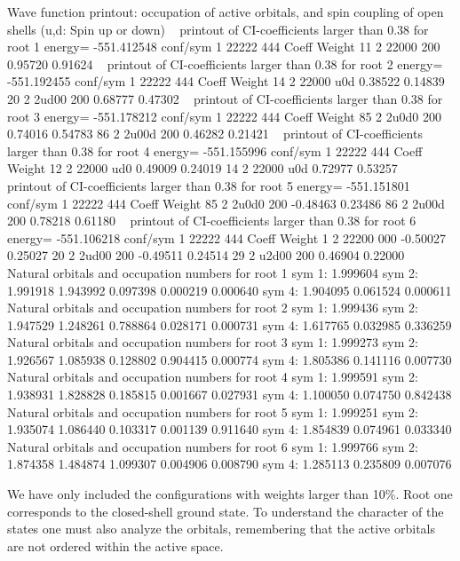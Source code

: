 \begin{sourcelisting}
                                  Wave function printout:
occupation of active orbitals, and spin coupling of open shells (u,d: Spin up or down)
~
	printout of CI-coefficients larger than  0.38 for root  1
      energy=	-551.412548
	conf/sym	1 22222 444	Coeff  Weight
            11	2 22000 200   0.95720 0.91624
~
	printout of CI-coefficients larger than  0.38 for root  2
	energy=	-551.192455
	conf/sym	1 22222 444	Coeff  Weight
            14	2 22000 u0d   0.38522 0.14839
            20	2 2ud00 200   0.68777 0.47302
~
	printout of CI-coefficients larger than  0.38 for root  3
	energy=	-551.178212
	conf/sym	1 22222 444	Coeff  Weight
            85	2 2u0d0 200   0.74016 0.54783
	    86	2 2u00d 200   0.46282 0.21421
~
	printout of CI-coefficients larger than  0.38 for root  4
	energy=	-551.155996
	conf/sym	1 22222 444	Coeff  Weight
            12	2 22000 ud0   0.49009 0.24019
            14	2 22000 u0d   0.72977 0.53257
~
	printout of CI-coefficients larger than  0.38 for root  5
	energy=	-551.151801
	conf/sym	1 22222 444	Coeff  Weight
	    85	2 2u0d0 200  -0.48463 0.23486
	    86	2 2u00d 200   0.78218 0.61180
~
	printout of CI-coefficients larger than  0.38 for root  6
	energy=	-551.106218
	conf/sym	1 22222 444	Coeff  Weight
	     1	2 22200 000  -0.50027 0.25027
	    20	2 2ud00 200  -0.49511 0.24514
	    29	2 u2d00 200   0.46904 0.22000
~
	Natural orbitals and occupation numbers for root 1
	sym 1:   1.999604
	sym 2:   1.991918  1.943992  0.097398  0.000219  0.000640
	sym 4:   1.904095  0.061524  0.000611
	Natural orbitals and occupation numbers for root 2
	sym 1:   1.999436
	sym 2:   1.947529  1.248261  0.788864  0.028171  0.000731
	sym 4:   1.617765  0.032985  0.336259
	Natural orbitals and occupation numbers for root 3
	sym 1:   1.999273
	sym 2:   1.926567  1.085938  0.128802  0.904415  0.000774
	sym 4:   1.805386  0.141116  0.007730
	Natural orbitals and occupation numbers for root 4
	sym 1:   1.999591
	sym 2:   1.938931  1.828828  0.185815  0.001667  0.027931
	sym 4:   1.100050  0.074750  0.842438
	Natural orbitals and occupation numbers for root 5
	sym 1:   1.999251
	sym 2:   1.935074  1.086440  0.103317  0.001139  0.911640
	sym 4:   1.854839  0.074961  0.033340
	Natural orbitals and occupation numbers for root 6
	sym 1:   1.999766
	sym 2:   1.874358  1.484874  1.099307  0.004906  0.008790
	sym 4:   1.285113  0.235809  0.007076
\end{sourcelisting}

We have only included the configurations with weights larger than 10\%.
Root one corresponds to the closed-shell ground state. To understand
the character of the states one must also analyze the orbitals,
remembering that the active orbitals are not ordered within the 
active space. 

